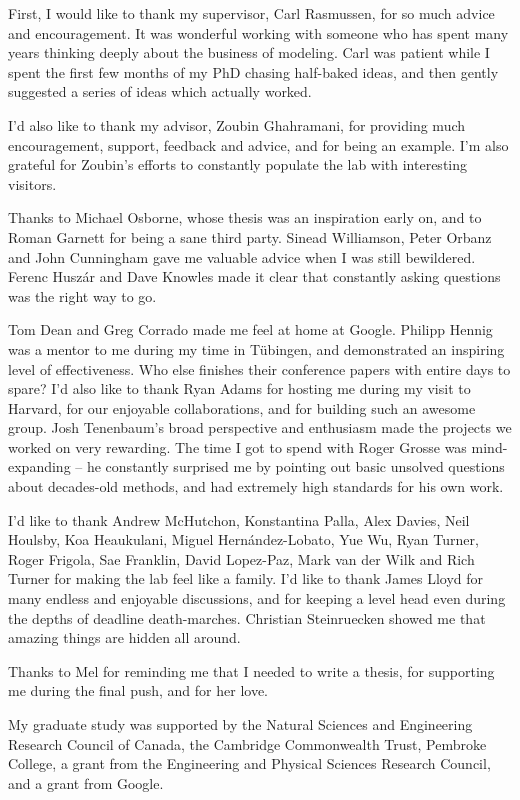 
\begin{acknowledgements}      


First, I would like to thank my supervisor, Carl Rasmussen, for so much advice and encouragement.
It was wonderful working with someone who has spent many years thinking deeply about the business of modeling.
Carl was patient while I spent the first few months of my PhD chasing half-baked ideas, and then gently suggested a series of ideas which actually worked.

I'd also like to thank my advisor, Zoubin Ghahramani, for providing much encouragement, support, feedback and advice, and for being an example.
I'm also grateful for Zoubin's efforts to constantly populate the lab with interesting visitors.

Thanks to Michael Osborne, whose thesis was an inspiration early on, and to Roman Garnett for being a sane third party.
Sinead Williamson, Peter Orbanz and John Cunningham gave me valuable advice when I was still bewildered.
Ferenc Husz\'ar and Dave Knowles made it clear that constantly asking questions was the right way to go.

Tom Dean and Greg Corrado made me feel at home at Google.
Philipp Hennig was a mentor to me during my time in T\"{u}bingen, and demonstrated an inspiring level of effectiveness.
Who else finishes their conference papers with entire days to spare?
I'd also like to thank Ryan Adams for hosting me during my visit to Harvard, for our enjoyable collaborations, and for building such an awesome group.
Josh Tenenbaum's broad perspective and enthusiasm made the projects we worked on very rewarding.
The time I got to spend with Roger Grosse was mind-expanding -- he constantly surprised me by pointing out basic unsolved questions about decades-old methods, and had extremely high standards for his own work.

I'd like to thank Andrew McHutchon, Konstantina Palla, Alex Davies, Neil Houlsby, Koa Heaukulani, Miguel Hern\'{a}ndez-Lobato, Yue Wu, Ryan Turner, Roger Frigola, Sae Franklin, David Lopez-Paz, Mark van der Wilk and Rich Turner for making the lab feel like a family.
I'd like to thank James Lloyd for many endless and enjoyable discussions, and for keeping a level head even during the depths of deadline death-marches.
Christian Steinruecken showed me that amazing things are hidden all around.

Thanks to Mel for reminding me that I needed to write a thesis, for supporting me during the final push, and for her love.

My graduate study was supported by the Natural Sciences and Engineering Research Council of Canada, the Cambridge Commonwealth Trust, Pembroke College, a grant from the Engineering and Physical Sciences Research Council, and a grant from Google.

\end{acknowledgements}
